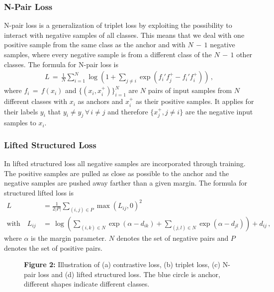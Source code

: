 \documentclass[12pt,paper=a4]{scrartcl}
\theoremstyle{break}
\begin{document}
\subsubsection{N-Pair Loss}
N-pair loss is a generalization of triplet loss by exploiting the possibility to interact with negative samples of all classes. This means that we deal with one positive sample from the same class as the anchor and with $N \, - \, 1$ negative samples, where every negative sample is from a different class of the $N \, - \, 1$ other classes. The formula for N-pair loss is 
\begin{align}
L\, = \, \frac{1}{N}\sum_{i=1}^N\log \left( 1+\sum_{j\neq i}\exp \left( f_i' f_j^+ - f_i' f_i^+\right) \right) \, ,
\end{align}
where $f_i\, = \, f(x_i)$ and $\{(x_i, x_i^+)\}_{i=1}^N$ are $N$ pairs of input samples from $N$ different classes with $x_i$ as anchors and $x_i^+$ as their positive samples. It applies for their labels $y_i$ that $y_i \neq y_j \, \forall \, i\neq j$ and therefore $\{x_j^+, j\neq i\}$ are the negative input samples to $x_i$.\cite{npair}
\subsubsection{Lifted Structured Loss}
In lifted structured loss all negative samples are incorporated through training. The positive samples are pulled as close as possible to the anchor and the negative samples are pushed away farther than a given margin. The formula for structured lifted loss is
\begin{align}
L &= \frac{1}{2|P|}\sum_{(i,j)\in P}\max\left(L_{ij}, 0\right)^2 \\
\text{with} \quad L_{ij} \, &= \, \log \left( \sum_{(i,k)\in N} \exp \left( \alpha - d_{ik}\right) + \sum_{(j,l)\in N}\exp \left(\alpha - d_{jl}\right)\right)+d_{ij}\, ,
\end{align}
where $\alpha$ is the margin parameter. $N$ denotes the set of negative pairs and $P$ denotes the set of positive pairs.\cite{lifted}
\begin{figure}[h]%
  \centering
  \qquad
  \caption{\textbf{Figure 2:} Illustration of (a) contrastive loss, (b) triplet loss, (c) N-pair loss and (d) lifted structured loss. The blue circle is anchor, different shapes indicate different classes.}%
\end{figure}
\end{document}
